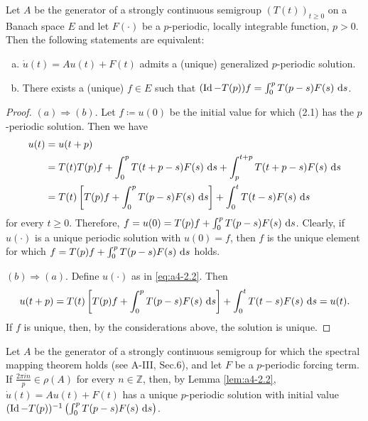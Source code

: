 \begin{lemma}\label{lem:a4-2.2}
Let $A$ be the generator of a strongly continuous semigroup $(T(t))_{t \geq 0}$ on a Banach space $E$ and let $F(\cdot)$ be a $p$-periodic, locally integrable function, $p > 0$. 
Then the following statements are equivalent:
\begin{enumerate}[(a)]
\item $\dot{u}(t) = Au(t) + F(t)$ admits a (unique) generalized $p$-periodic solution.
\item There exists a (unique) $f \in E$ such that $(\operatorname{Id} - T(p))f = \int_{0}^{p} T(p-s)F(s) \,\mathop{}\!\mathrm{d}{s}$.
\end{enumerate}
\end{lemma}

\begin{proof}
$(a) \Rightarrow (b)$. 
Let $f \coloneqq u(0)$ be the initial value for which (2.1) has the $p$-periodic solution. 
Then we have
\begin{align*}
u(t) &= u(t+p) \\
&= T(t)T(p)f + \int_{0}^{p} T(t+p-s)F(s) \,\mathop{}\!\mathrm{d}{s} + \int_{p}^{t+p} T(t+p-s)F(s) \,\mathop{}\!\mathrm{d}{s} \\
&= T(t)\left[T(p)f + \int_{0}^{p} T(p-s)F(s) \,\mathop{}\!\mathrm{d}{s}\right] + \int_{0}^{t} T(t-s)F(s) \,\mathop{}\!\mathrm{d}{s}
\end{align*}
for every $t \geq 0$. 
Therefore, $f = u(0) = T(p)f + \int_{0}^{p} T(p-s)F(s) \,\mathop{}\!\mathrm{d}{s}$.
Clearly, if $u(\cdot)$ is a unique periodic solution with $u(0) = f$, then $f$ is the unique element for which $f = T(p)f + \int_{0}^{p} T(p-s)F(s) \,\mathop{}\!\mathrm{d}{s}$ holds.


$(b) \Rightarrow (a)$. 
Define $u(\cdot)$ as in \eqref{eq:a4-2.2}. 
Then
\begin{align*}
u(t+p) = T(t)\left[T(p)f + \int_{0}^{p} T(p-s)F(s) \,\mathop{}\!\mathrm{d}{s}\right] + \int_{0}^{t} T(t-s)F(s) \,\mathop{}\!\mathrm{d}{s} = u(t).
\end{align*}
If $f$ is unique, then, by the considerations above, the solution is unique.
\end{proof}

\begin{remark}\label{rem:a4-2.3}
Let $A$ be the generator of a strongly continuous semigroup for which the spectral mapping theorem holds (see A-III, Sec.6), and let $F$ be a $p$-periodic forcing term.
If $\frac{2\pi in}{p} \in \rho(A)$ for every $n \in \mathbb{Z}$, then, by Lemma \ref{lem:a4-2.2}, $\dot{u}(t) = Au(t) + F(t)$ has a unique $p$-periodic solution with initial value $(\operatorname{Id} - T(p))^{-1} \left(\int_{0}^{p} T(p-s)F(s) \,\mathop{}\!\mathrm{d}{s}\right)$.
\end{remark}

